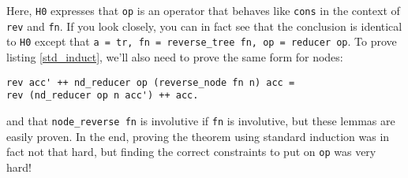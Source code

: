 \documentclass{article}
\newcommand{\code}[1]{\texttt{#1}}
\begin{document}
Here, \code{H0} expresses that \code{op} is an operator that behaves like
\code{cons} in the context of \code{rev} and \code{fn}. If you look closely,
you can in fact see that the conclusion is identical to \code{H0} except
that \code{a = tr, fn = reverse\_tree fn, op = reducer op}. To prove
listing \ref{std_induct}, we'll also need to prove the same form for nodes:

\begin{verbatim}
rev acc' ++ nd_reducer op (reverse_node fn n) acc =
rev (nd_reducer op n acc') ++ acc.
\end{verbatim}

and that \code{node\_reverse fn} is involutive if \code{fn} is involutive, but
these lemmas are easily proven.
In the end, proving the theorem using standard induction was in fact not that
hard, but finding the correct constraints to put on \code{op} was very hard!



\end{document}

